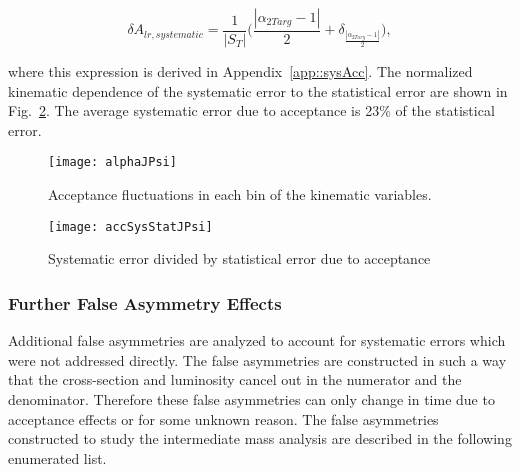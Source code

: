 \begin{equation}
  \delta A_{lr,systematic} =
  \frac{1}{|S_T|}
  \Big(\frac{|\alpha_{2Targ}-1|}{2}
  + \delta_{\frac{|\alpha_{2Targ}-1|}{2}} \Big),
\end{equation}

\noindent
where this expression is derived in Appendix~\ref{app::sysAcc}.  The normalized
kinematic dependence of the systematic error to the statistical error are shown
in Fig.~\ref{fig::accSysStatJPsi}.  The average systematic error due to
acceptance is 23\% of the statistical error.

\begin{figure}[h!t]
  \begin{center}
    \texttt{[image: alphaJPsi]}
    \caption{Acceptance fluctuations in each bin of the kinematic variables.}
    \label{fig::alphaJPsi}
  \end{center}
\end{figure}

\begin{figure}[h!t]
  \begin{center}
    \texttt{[image: accSysStatJPsi]}
    \caption{Systematic error divided by statistical error due to acceptance}
    \label{fig::accSysStatJPsi}
  \end{center}
\end{figure}

\subsubsection{Further False Asymmetry Effects}
Additional false asymmetries are analyzed to account for systematic errors which
were not addressed directly.  The false asymmetries are constructed in such a
way that the cross-section and luminosity cancel out in the numerator and the
denominator.  Therefore these false asymmetries can only change in time due to
acceptance effects or for some unknown reason.  The false asymmetries
constructed to study the intermediate mass analysis are described in the
following enumerated list.

